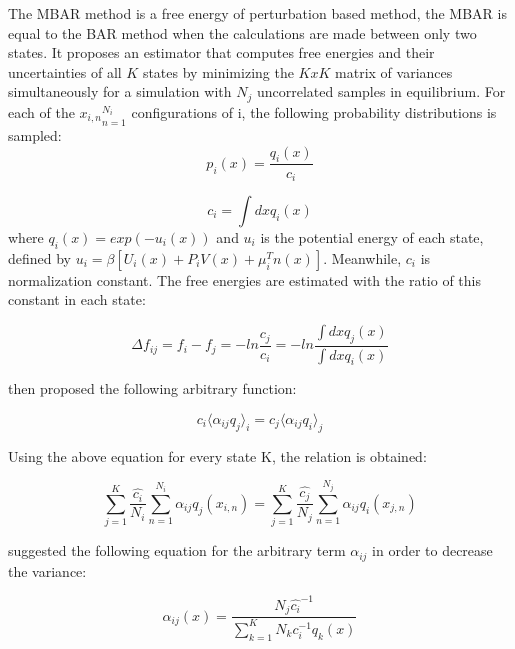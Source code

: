 The MBAR method is a free energy of perturbation based method, the MBAR is equal to the BAR method when the calculations are made between only two states. It proposes an estimator that computes free energies and their uncertainties of all $K$ states  by minimizing the $KxK$ matrix of variances simultaneously for a simulation with $N_{j}$ uncorrelated samples in equilibrium. For each of the ${x_{i,n}}_{n=1}^{N_{i}}$ configurations of i, the following probability distributions is sampled:
\begin{equation}
p_{i}(x) = \frac{q_{i}(x)}{c_{i}}
\end{equation}

\begin{equation}
c_{i} = \int dx q_{i}(x)
\end{equation}
where $q_{i}(x)=exp(-u_{i}(x))$ and $u_{i}$ is the potential energy of each state, defined by $u_{i}= \beta [U_{i}(x)+P_{i}V(x) + \mu _{i}^{T}n(x)]$. Meanwhile, $c_{i}$ is normalization constant.  The free energies are estimated with the ratio of this constant in each state:

\begin{equation}
\Delta f_{ij} = f_{i} - f_{j} = - ln \frac{c_{j}}{c_{i}}  = -ln \frac{\int dx q_{j}(x)}{\int dx q_{i}(x)} 
\end{equation}

 then proposed the following arbitrary function:

\begin{equation}
c_{i} \langle \alpha _{ij} q_{j} \rangle _{i}  =  c_{j} \langle \alpha _{ij} q_{i} \rangle _{j} 
\end{equation}

Using the above equation for every state  K, the relation is obtained:

\begin{equation}
\label{eq:mbar1}
\sum_{j=1}^{K} \frac{\hat{c_{i}}}{N_{i}} \sum_{n=1}^{N_{i}} \alpha _{ij} q_{j} (x_{i,n}) =  \sum_{j=1}^{K} \frac{\hat{c_{j}}}{N_{j}} \sum_{n=1}^{N_{j}} \alpha _{ij} q_{i} (x_{j,n})
\end{equation}

 suggested the following equation for the arbitrary term $\alpha _{ij}$ in order to decrease the variance:

\begin{equation}
\label{eq:mbar2}
\alpha _{ij} (x) = \frac{N_{j} \hat{c_{i}} ^{-1}}{\sum_{k=1}^{K} N_{k} c_{i} ^{-1} q_{k}(x)}
\end{equation}

